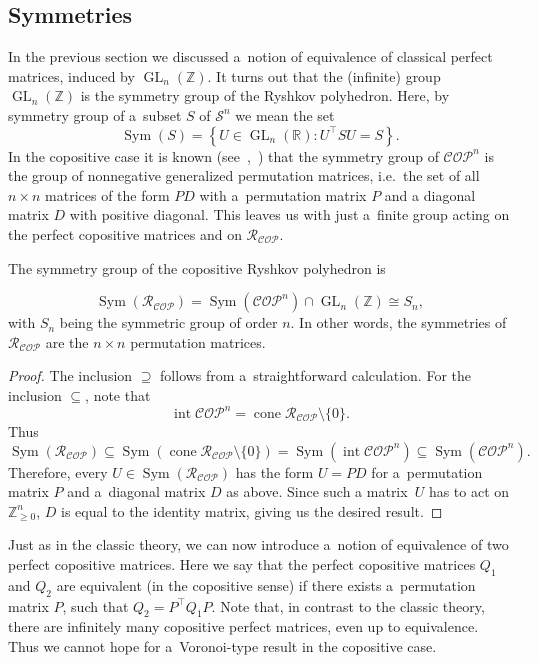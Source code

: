 \documentclass{commat}
\newcommand{\IZ}{{\mathbb{Z}}}
\newcommand{\IR}{{\mathbb{R}}}
\newcommand{\sR}{\mathcal{R}}
\DeclareMathOperator{\cone}{cone}
\DeclareMathOperator{\interior}{int}
\newcommand{\sn}{{\mathcal{S}}^{n}}
\newcommand{\IZngeo}{\IZ_{\geq0}^n}
\newcommand{\cop}{{\mathcal{COP}}}
\newcommand{\copn}{{\mathcal{COP}}^{n}}
\newcommand{\gl}{\operatorname{GL}}
\newcommand{\glnz}{\gl_n (\IZ)}
\newcommand{\glnr}{\gl_n (\IR)}
\begin{document}
\subsection*{Symmetries}
In the previous section we discussed a~notion of equivalence of classical perfect matrices,
induced by \(\glnz \).
It turns out that the (infinite) group \(\glnz \) is the symmetry group of the Ryshkov polyhedron.
Here, by symmetry group of a~subset $S$ of \(\sn \) we mean the set
\[
    \operatorname{Sym}(S)=\left\{ U\in\glnr: U^\intercal SU=S \right\}.
\]
In the copositive case it is known (see~\cite{sst-2013},~\cite{shitov-2021}) that the
symmetry group of \(\copn \) is the group of nonnegative generalized permutation matrices,
i.e.\ the set of all \(n\times n\) matrices of the form \(PD \) with a~permutation matrix $P$ and
a diagonal matrix $D$ with positive diagonal.
This leaves us with just a~finite group acting on the perfect copositive matrices and on \(\sR_\cop \).
\begin{lemma}\label{lem:symmetrygroup}
	The symmetry group of the copositive Ryshkov polyhedron is
	
\[
		\operatorname{Sym}(\sR_\cop)=\operatorname{Sym}(\copn)\cap\glnz\cong S_n,
\]
	with \(S_n \) being the symmetric group of order $n$.
	In other words, the symmetries of \(\sR_\cop \) are the \(n\times n\) permutation matrices.
\end{lemma}
\begin{proof}
    The inclusion \(\supseteq \) follows from a~straightforward calculation.
    For the inclusion \(\subseteq \), note that~\cite[Section 2.2]{dsv-2021}
    \[
        \interior\copn = \cone\sR_\cop\setminus\{0\}.
    \]
    Thus
    \[
        \operatorname{Sym}(\sR_\cop)\subseteq
        \operatorname{Sym}(\cone\sR_\cop\setminus\{0\})=
		\operatorname{Sym}(\interior\copn)\subseteq
        \operatorname{Sym}(\copn).
    \]
    Therefore, every \(U \in\operatorname{Sym}(\sR_\cop) \) has the form \(U=PD \)
    for a~permutation matrix $P$ and a~diagonal matrix $D$ as above.
    Since such a matrix~$U$ has to act on \(\IZngeo \), $D$ is equal to the identity matrix,
    giving us the desired result.
\end{proof}
Just as in the classic theory, we can now introduce a~notion of equivalence of two perfect
copositive matrices.
Here we say that the perfect copositive matrices \(Q_1 \) and \(Q_2 \) are equivalent
(in the copositive sense) if there exists a~permutation matrix $P$,
such that \(Q_2 = P^\intercal Q_1P \).
Note that, in contrast to the classic theory, there are infinitely many copositive perfect matrices,
even up to equivalence.
Thus we cannot hope for a~Voronoi-type result in the copositive case.
\end{document}
